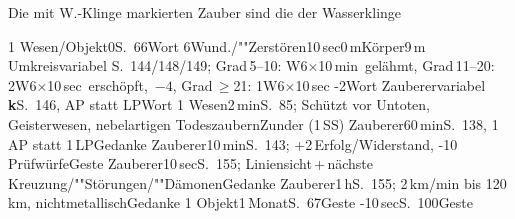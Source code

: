 \documentclass{m5figur-mv}[2018/10/19]
\begin{document}
{{
\begin{minipage}{\Halbseitenbreite}%
\end{minipage}%
\begin{minipage}{\Halbseitenbreite}%
\scriptsize Die mit W.-Klinge markierten Zauber sind die der Wasserklinge
\end{minipage}%
\clearpage
} %

{%
%
  {1 Wesen/Objekt}{0}{S.~66}{Wort}
%
  {6}{Wund./""Zerstören}{10\,sec}{0\,m}{Körper}{9\,m Umkreis}{variabel}%
  {S.~144/148/149;
  Grad\,5--10: W6$\times$10\,min~gelähmt,
  Grad\,11--20: 2W6$\times$10\,sec~erschöpft,~$-4$,
  Grad\,$\ge$21: 1W6$\times$10\,sec -2}{Wort}
%
  {Zauberer}{variabel \textbf{k}}{S.~146, AP statt LP}{Wort}
%
  {1 Wesen}{2\,min}{S.~85; Schützt vor Untoten, Geisterwesen, nebelartigen
  Todeszaubern}{Zunder (1\,SS)}
%
  {Zauberer}{60\,min}{S.~138, 1\,AP statt 1\,LP}{Gedanke}
%
  {Zauberer}{10\,min}{S.~143; +2\,Erfolg/Widerstand, -10\,Prüfwürfe}{Geste}
%
  {Zauberer}{10\,sec}{S.~155; Liniensicht\,+\,nächste
  Kreuzung/""Störungen/""Dämonen}{Gedanke}
%
  {Zauberer}{1\,h}{S.~155; 2\,km/min bis 120\,km, nichtmetallisch}{Gedanke}
%
  {1 Objekt}{1\,Monat}{S.~67}{Geste}
%
  {-}{10\,sec}{S.~100}{Geste}

}}
\end{document}
